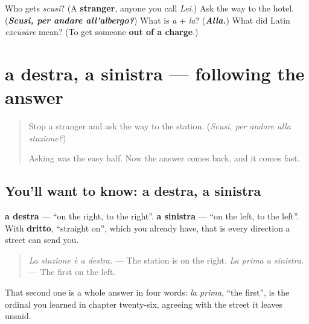 \begin{tcolorbox}[breakable,colback=teal!4,colframe=teal!35!black,title={Before you move on}]
Who gets \emph{scusi}? (A \textbf{stranger}, anyone you call \emph{Lei}.) Ask the way to the hotel. (\emph{\textbf{Scusi, per andare all'albergo?}}) What is \emph{a} + \emph{la}? (\emph{\textbf{Alla.}}) What did Latin \emph{excūsāre} mean? (To get someone \textbf{out of a charge}.)
\end{tcolorbox}
\section[a destra, a sinistra]{a destra, a sinistra — following the answer}

\label{lesson:IT-C267-destra-sinistra}



\begin{quote}
Stop a stranger and ask the way to the station. (\emph{Scusi, per andare alla stazione?})

Asking was the easy half. Now the answer comes back, and it comes fast.
\end{quote}

\subsection*{You'll want to know: a destra, a sinistra}
\textbf{a destra} — \textquotedblleft{}on the right, to the right\textquotedblright{}. \textbf{a sinistra} — \textquotedblleft{}on the left, to the left\textquotedblright{}. With \textbf{dritto}, \textquotedblleft{}straight on\textquotedblright{}, which you already have, that is every direction a street can send you.

\begin{quote}
\emph{La stazione è a destra.} — The station is on the right. \emph{La prima a sinistra.} — The first on the left.
\end{quote}

That second one is a whole answer in four words: \emph{la prima}, \textquotedblleft{}the first\textquotedblright{}, is the ordinal you learned in chapter twenty-six, agreeing with the street it leaves unsaid.

